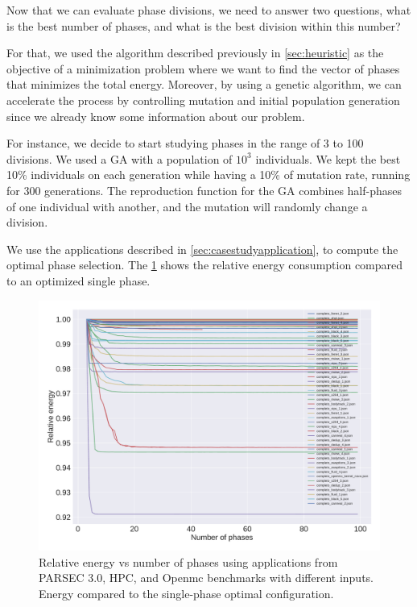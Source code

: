 Now that we can evaluate phase divisions, we need to answer two questions, what is the best number of phases, and what is the best division within this number?

For that, we used the algorithm described previously in \cref{sec:heuristic} as the objective of a minimization problem where we want to find the vector of phases that minimizes the total energy. Moreover, by using a genetic algorithm, we can accelerate the process by controlling mutation and initial population generation since we already know some information about our problem.

For instance, we decide to start studying phases in the range of 3 to 100 divisions. We used a GA with a population of $10^3$ individuals. We kept the best 10\% individuals on each generation while having a 10\% of mutation rate, running for 300 generations. The reproduction function for the GA combines half-phases of one individual with another, and the mutation will randomly change a division.

We use the applications described in \cref{sec:casestudyapplication}, to compute the optimal phase selection. The \cref{fig:relative_energy} shows the relative energy consumption compared to an optimized single phase.

\begin{figure}[H]
	\includegraphics[width=\columnwidth]{fingerprint/figures/energy_per_phase.pdf}
	\caption{Relative energy vs number of phases using applications from PARSEC 3.0, HPC, and Openmc benchmarks with different inputs. Energy compared to the single-phase optimal configuration.}
	\label{fig:relative_energy}
\end{figure}

